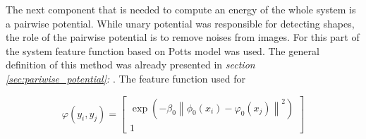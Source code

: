 The next component that is needed to compute an energy of the whole system is a pairwise potential. While unary potential was responsible for detecting shapes, the role of the pairwise potential is to remove noises from images. For this part of the system feature function based on Potts model was used. The general definition of this method was already presented in \textit{section \ref{sec:pariwise_potential}: }. The feature function used for 

\begin{equation}
    \label{eq:potts_model}
    \varphi(y_i,y_j) = \begin{bmatrix}
        \exp{(-\beta_0 \left \| \phi_0(x_i) - \varphi_0(x_j)\right \|^2)} \\
        1
    \end{bmatrix}
\end{equation}